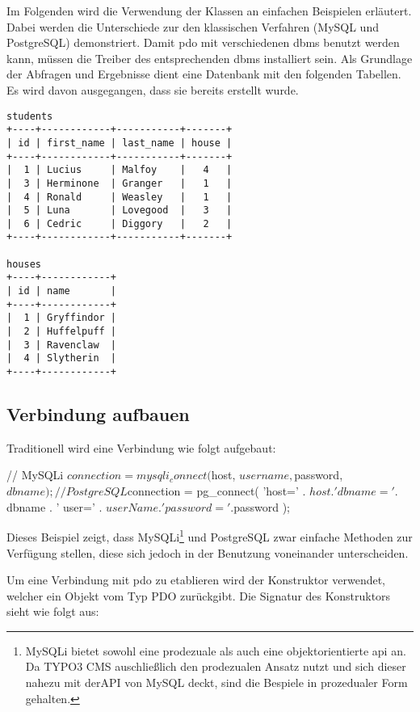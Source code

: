 Im Folgenden wird die Verwendung der Klassen an einfachen Beispielen erläutert. Dabei werden die Unterschiede zur den klassischen Verfahren (MySQL und PostgreSQL) demonstriert. Damit \gls{pdo} mit verschiedenen \gls{dbms} benutzt werden kann, müssen die Treiber des entsprechenden \gls{dbms} installiert sein. Als Grundlage der Abfragen und Ergebnisse dient eine Datenbank mit den folgenden Tabellen. Es wird davon ausgegangen, dass sie bereits erstellt wurde.

\begin{Verbatim}[samepage=true]
students
+----+------------+-----------+-------+
| id | first_name | last_name | house |
+----+------------+-----------+-------+
|  1 | Lucius     | Malfoy    |   4   |
|  3 | Herminone  | Granger   |   1   |
|  4 | Ronald     | Weasley   |   1   |
|  5 | Luna       | Lovegood  |   3   |
|  6 | Cedric     | Diggory   |   2   |
+----+------------+-----------+-------+

houses
+----+------------+
| id | name       |
+----+------------+
|  1 | Gryffindor |
|  2 | Huffelpuff |
|  3 | Ravenclaw  |
|  4 | Slytherin  |
+----+------------+
\end{Verbatim}

\subsection{Verbindung aufbauen}
Traditionell wird eine Verbindung wie folgt aufgebaut:

\begin{phpcode}
// MySQLi
$connection = mysqli_connect(
    $host,
    $username,
    $password,
    $dbname
);

// PostgreSQL
$connection = pg_connect(
    'host=' . $host .
    ' dbname=' . $dbname .
    ' user=' . $userName .
    ' password=' . $password
);
\end{phpcode}

Dieses Beispiel zeigt, dass MySQLi\footnote{MySQLi bietet sowohl eine prodezuale als auch eine objektorientierte \gls{api} an. Da TYPO3 CMS auschließlich den  prodezualen Ansatz nutzt und sich dieser nahezu mit derAPI von MySQL deckt, sind die Bespiele in prozedualer Form gehalten.} und PostgreSQL zwar einfache Methoden zur Verfügung stellen, diese sich jedoch in der Benutzung voneinander unterscheiden.

Um eine Verbindung mit \gls{pdo} zu etablieren wird der Konstruktor verwendet, welcher ein Objekt vom Typ PDO zurückgibt. Die Signatur des Konstruktors sieht wie folgt aus:

